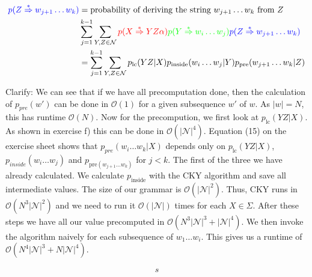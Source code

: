 \documentclass[a4paper,12pt]{ETHexercise}
\begin{document}
\begin{question}
\begin{subquestion}
\begin{align}
			{\color{blue}p(Z \overset{*}{\Rightarrow} w_{j+1} \dots w_k)} & = \text{probability of deriving the string $w_{j+1} \dots w_k$ from $Z$} \label{eq:pre4}                                                                                                                                                  \\
			                                                              & \sum_{j=1}^{k-1} \sum_{Y,Z \in \mathcal{N}} {\color{red} p(X \overset{*}{\Rightarrow} YZ\alpha)}{\color{green}p(Y \overset{*}{\Rightarrow} w_i \dots w_j)}{\color{blue} p(Z \overset{*}{\Rightarrow} w_{j+1} \dots w_k)}                  \\& =\sum_{j=1}^{k-1} \sum_{Y,Z \in \mathcal{N}}p_{\text{lc}}(YZ | X) p_{\text{inside}}(w_i \dots w_j | Y) p_{\text{pre}}(w_{j+1} \dots w_k | Z) \label{eq:pre5}                                                                               \\
		\end{align}
	\end{subquestion}
	\begin{subquestion}
		Clarify:
		We can see that if we have all precomputation done, then the calculation of $p_{pre}(w')$ can be done in $\mathcal{O}(1)$ for a given subsequence $w'$ of $w$. As $|w| = N$, this has runtime $\mathcal{O}(N)$.
		Now for the precompution, we first look at $p_{\text{lc}}(YZ | X)$. As shown in exercise f) this can be done in $\mathcal{O}(|\mathcal{N}|^4)$.
		Equation (15) on the exercise sheet shows that $p_{pre}(w_i \dots w_k | X)$ depends only on $p_{\text{lc}}(YZ | X)$, $p_{inside}(w_i \dots w_j)$ and $p_{\text{pre}(w_{j+1} \dots w_k)}$ for $j < k$. The first of the three we have already calculated. We calculate $p_{\text{inside}}$ with the CKY algorithm and save all intermediate values. The size of our grammar is $\mathcal{O}(|\mathcal{N}|^2)$. Thus, CKY runs in $\mathcal{O}(N^3 |\mathcal{N}|^2)$ and we need to run it $\mathcal{O}(|\mathcal{N}|)$ times for each $X \in \Sigma$.
		\newline
		After these steps we have all our value precomputed in $\mathcal{O}(N^3 |\mathcal{N}|^3 + |\mathcal{N}|^4)$.
		We then invoke the algorithm naively for each subsequence of $w_1 \dots w_i$. This gives us a runtime of $\mathcal{O}(N^4 |\mathcal{N}|^3 + N|\mathcal{N}|^4)$.
	\end{subquestion}
	\begin{align}
		s
	\end{align}
\end{question}
\end{document}
